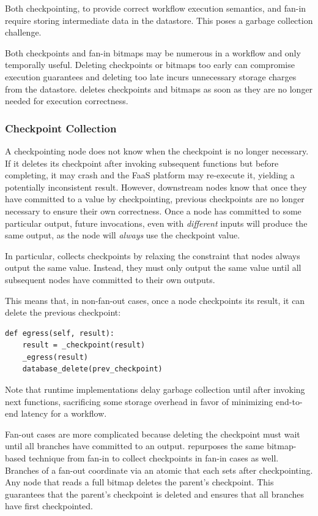 Both checkpointing, to provide correct workflow execution semantics, and fan-in
require storing intermediate data in the datastore. This poses a garbage
collection challenge.

Both checkpoints and fan-in bitmaps may be numerous in a workflow and only
temporally useful. Deleting checkpoints or bitmaps too early can compromise
execution guarantees and deleting too late incurs unnecessary storage charges
from the datastore. \name{} deletes checkpoints and bitmaps as soon as they are
no longer needed for execution correctness.

\subsubsection{Checkpoint Collection}

A checkpointing node does not know when the checkpoint is no longer necessary.
If it deletes its checkpoint after invoking subsequent functions but before
completing, it may crash and the FaaS platform may re-execute it, yielding a
potentially inconsistent result. However, downstream nodes know that once they
have committed to a value by checkpointing, previous checkpoints are no longer
necessary to ensure their own correctness. Once a node has committed to some
particular output, future invocations, even with \emph{different} inputs will produce the same output, as the node will \emph{always} use the checkpoint value.

In particular, \name{} collects checkpoints by relaxing the constraint that
nodes always output the same value. Instead, they must only output the same
value until all subsequent nodes have committed to their own outputs.

This means that, in non-fan-out cases, once a node checkpoints its result, it
can delete the previous checkpoint:

\begin{verbatim}
def egress(self, result):
    result = _checkpoint(result)
    _egress(result)
    database_delete(prev_checkpoint)
\end{verbatim}

Note that \name{} runtime implementations delay garbage collection until after
invoking next functions, sacrificing some storage overhead in favor of
minimizing end-to-end latency for a workflow.

Fan-out cases are more complicated because deleting the checkpoint must wait
until all branches have committed to an output. \name{} repurposes the same
bitmap-based technique from fan-in to collect checkpoints in fan-in cases as
well. Branches of a fan-out coordinate via an atomic that each sets after
checkpointing. Any node that reads a full bitmap deletes the parent's
checkpoint. This guarantees that the parent's checkpoint is deleted and ensures
that all branches have first checkpointed.

